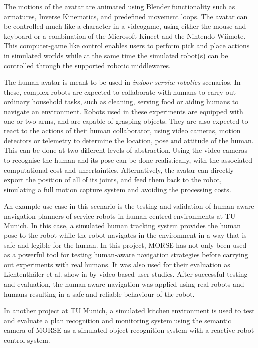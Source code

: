 \documentclass{llncs}
\begin{document}
The motions of the avatar are animated using Blender functionality such as
armatures, Inverse Kinematics, and predefined movement loops.
The avatar can be controlled much like a character in a videogame, using either
the mouse and keyboard or a combination of the Microsoft Kinect and the
Nintendo Wiimote. This computer-game like control enables users to perform
pick and place actions in simulated worlds while at the same time the
simulated robot(s) can be controlled through the supported robotic middlewares.


The human avatar is meant to be used in \emph{indoor service robotics} scenarios.
In these, complex robots are expected to collaborate with humans to carry out
ordinary household tasks, such as cleaning, serving food or aiding humans to
navigate an environment.
Robots used in these experiments are equipped with one or two arms, and are
capable of grasping objects. They are also expected to react to the actions of
their human collaborator, using video cameras, motion detectors or telemetry to
determine the location, pose and attitude of the human.
This can be done at two different levels of
abstraction. Using the video cameras to recognise the human and its pose can be
done realistically, with the associated computational cost and uncertainties.
Alternatively, the avatar can directly export the position of all of its
joints, and feed them back to the robot, simulating a full motion capture
system and avoiding the processing costs.


An example use case in this scenario is the testing and validation of human-aware
navigation planners of service robots in human-centred environments at TU Munich.
In this case, a simulated human tracking system provides the human pose to the
robot while the robot navigates in the environment in a way that is safe and
legible for the human. In this project, MORSE has not only been used as a
powerful tool for testing human-aware navigation strategies before carrying out
experiments with real humans. It was also used for their evaluation as
Lichtenth{\"a}ler et al. show in \cite{lichtenthaeler2012increasing} by
video-based user studies. After successful testing and evaluation, the
human-aware navigation was applied using real robots and humans resulting in
a safe and reliable behaviour of the robot.

In another project at TU Munich, a simulated kitchen environment is used
to test and evaluate a plan recognition and monitoring system using the
semantic camera of MORSE as a simulated object recognition system with
a reactive robot control system.
\end{document}
